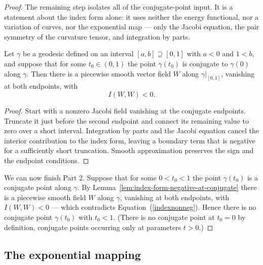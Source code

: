 \begin{proof}
The remaining step isolates all of the conjugate-point input.  It is a statement
about the index form alone: it uses neither the energy functional, nor a
variation of curves, nor the exponential map — only the Jacobi equation, the pair
symmetry of the curvature tensor, and integration by parts.

\begin{lemma}
\label{lem:index-form-negative-at-conjugate}
\leanok



Let $\gamma$ be a geodesic defined on an interval $[a,b]\supseteq [0,1]$ with
$a<0$ and $1<b$, and suppose that for some $t_0\in(0,1)$ the point $\gamma(t_0)$
is conjugate to $\gamma(0)$ along $\gamma$. Then there is a piecewise smooth
vector field $W$ along $\gamma|_{[0,1]}$, vanishing at both endpoints, with
$$I(W,W)<0 .$$
\end{lemma}

\begin{proof}
\sketch
{}
\leanok
Start with a nonzero Jacobi field vanishing at the conjugate endpoints. Truncate it just before the second endpoint and connect its remaining value to zero over a short interval. Integration by parts and the Jacobi equation cancel the interior contribution to the index form, leaving a boundary term that is negative for a sufficiently short truncation. Smooth approximation preserves the sign and the endpoint conditions.
\end{proof}

We can now finish Part 2. Suppose that for some $0<t_0<1$ the point
$\gamma(t_0)$ is a conjugate point along $\gamma$. By
Lemma~\ref{lem:index-form-negative-at-conjugate} there is a piecewise smooth
field $W$ along $\gamma$, vanishing at both endpoints, with $I(W,W)<0$ --- which
contradicts Equation~(\ref{indexnonneg}). Hence there is no conjugate point
$\gamma(t_0)$ with $t_0<1$. (There is no conjugate point at $t_0=0$ by
definition, conjugate points occurring only at parameters $t>0$.)
\end{proof}






\subsection{The exponential mapping}


